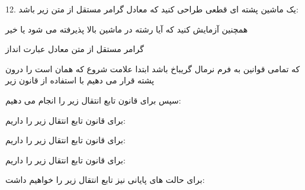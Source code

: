 \documentclass[]{article}
\begin{document}
12. یک ماشین پشته ای قطعی طراحی کنید که معادل گرامر مستقل از متن زیر باشد:

\begin{center}
\end{center}

همچنین آزمایش کنید که آیا رشته  در ماشین بالا پذیرفته می شود یا خیر

گرامر مستقل از متن معادل عبارت انداز

\begin{center}
\end{center}

که تمامی قوانین به فرم نرمال گریباخ باشد
ابتدا علامت شروع که همان  است را درون پشته قرار می دهیم با استفاده از قانون زیر

\begin{center}
\end{center}

سپس برای قانون    تابع انتقال زیر را انجام می دهیم:

\begin{center}
\end{center}

برای قانون  تابع انتقال زیر را داریم:

\begin{center}
\end{center}

برای قانون  تابع انتقال زیر را داریم:

\begin{center}
\end{center}

برای قانون  تابع انتقال زیر را داریم:

\begin{center}
\end{center}

برای حالت های پایانی نیز تابع انتقال زیر را خواهیم داشت:

\begin{center}
\end{center}
		
\end{document}
